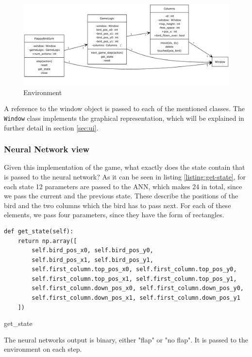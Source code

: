 \begin{figure}
    \centering
    \includegraphics[width=\textwidth]{media/gym.pdf}
    \caption{Environment}
    \label{fig:uml-gym}
\end{figure}

A reference to the window object is passed to each of the mentioned classes. The \texttt{Window} class implements the graphical representation, which will be explained in further detail in section \ref{sec:ui}.

\subsubsection{Neural Network view}

Given this implementation of the game, what exactly does the state contain that is passed to the neural network? As it can be seen in 
listing \ref{listing:get-state}, for each state 12 parameters are passed to the ANN, which makes 24 in total, since we pass the current and the previous state. These describe the positions of the bird and the two columns which the bird has to pass next. For each of these elements, we pass four parameters, since they have the form of rectangles.
\begin{listing}[!ht]
\begin{verbatim}
def get_state(self):
    return np.array([
        self.bird_pos_x0, self.bird_pos_y0,
        self.bird_pos_x1, self.bird_pos_y1,
        self.first_column.top_pos_x0, self.first_column.top_pos_y0,
        self.first_column.top_pos_x1, self.first_column.top_pos_y1,
        self.first_column.down_pos_x0, self.first_column.down_pos_y0,
        self.first_column.down_pos_x1, self.first_column.down_pos_y1
    ])
\end{verbatim}
\caption{get\_state}
\label{listing:get-state}
\end{listing}
The neural networks output is binary, either "flap" or "no flap". It is passed to the environment on each step.
